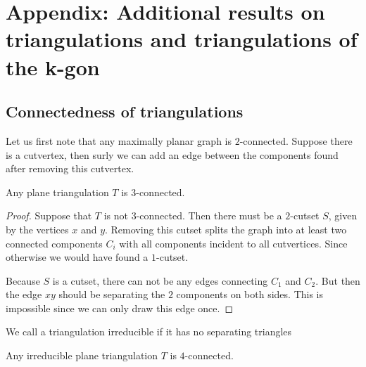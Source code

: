 

\section{Appendix: Additional results on triangulations and triangulations of the k-gon}

\subsection{Connectedness of triangulations}
  Let us first note that any maximally planar graph is $2$-connected. Suppose there is a cutvertex, then surly we can add an edge between the components found after removing this cutvertex.

  \begin{thrm}
    Any plane triangulation $T$ is $3$-connected.
    \label{th:plTri3Connected}
  \end{thrm}

  \begin{proof}
    Suppose that $T$ is not $3$-connected. Then there must be a $2$-cutset $S$, given by the vertices $x$ and $y$. Removing this cutset splits the graph into at least two connected components $C_i$ with all components incident to all cutvertices. Since otherwise we would have found a $1$-cutset.

    Because $S$ is a cutset, there can not be any edges connecting $C_1$ and $C_2$. But then the edge $xy$ should be separating the $2$ components on both sides. This is impossible since we can only draw this edge once.
  \end{proof}

  \begin{defi}
  We call a triangulation irreducible if it has no separating triangles
  \end{defi}


  \begin{thrm}
  Any irreducible plane triangulation $T$ is $4$-connected.
  \end{thrm}

